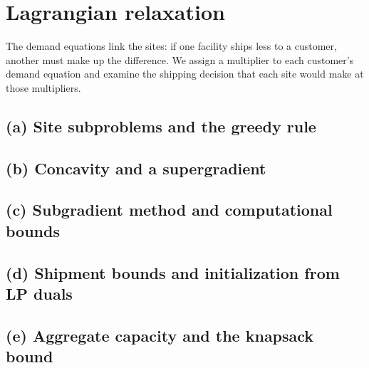 \documentclass[11pt]{article}
\theoremstyle{definition}
\begin{document}
\section{Lagrangian relaxation}

The demand equations link the sites: if one facility ships less to a
customer, another must make up the difference. We assign a multiplier to
each customer's demand equation and examine the shipping decision that
each site would make at those multipliers.

\subsection*{(a) Site subproblems and the greedy rule}

\subsection*{(b) Concavity and a supergradient}

\subsection*{(c) Subgradient method and computational bounds}

\subsection*{(d) Shipment bounds and initialization from LP duals}

\subsection*{(e) Aggregate capacity and the knapsack bound}
\end{document}
